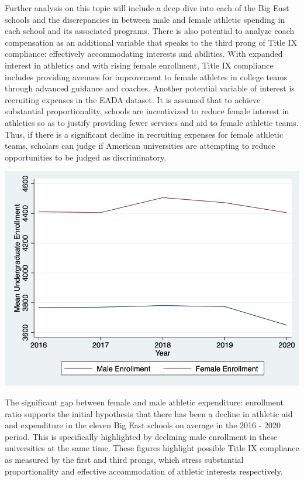 \documentclass[11pt]{article}
\begin{document}
Further analysis on this topic will include a deep dive into each of the Big East schools and the discrepancies in between male and female athletic spending in each school and its associated programs. There is also potential to analyze coach compensation as an additional variable that speaks to the third prong of Title IX compliance: effectively accommodating interests and abilities. With expanded interest in athletics and with rising female enrollment, Title IX compliance includes providing avenues for improvement to female athletes in college teams through advanced guidance and coaches. Another potential variable of interest is recruiting expenses in the EADA dataset. It is assumed that to achieve substantial proportionality, schools are incentivized to reduce female interest in athletics so as to justify providing fewer services and aid to female athletic teams. Thus, if there is a significant decline in recruiting expenses for female athletic teams, scholars can judge if American universities are attempting to reduce opportunities to be judged as discriminatory.

\medskip

\includegraphics[scale = 0.75]{graph2.png}

\medskip

The significant gap between female and male athletic expenditure: enrollment ratio supports the initial hypothesis that there has been a decline in athletic aid and expenditure in the eleven Big East schools on average in the 2016 - 2020 period. This is specifically highlighted by declining male enrollment in these universities at the same time. These figures highlight possible Title IX compliance as measured by the first and third prongs, which stress substantial proportionality and effective accommodation of athletic interests respectively.
\end{document}
